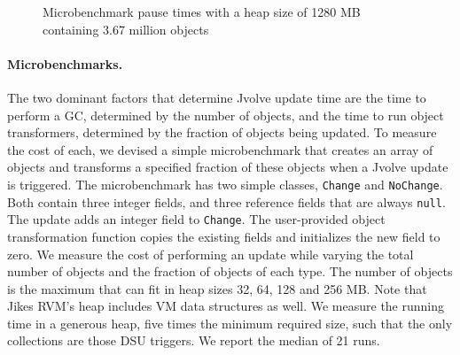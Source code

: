 \documentclass[9pt]{sigplanconf}
\newcommand{\DSU}{{\sc Jvolve}}
\newcommand{\JikesRVM}{Jikes RVM}
\begin{document}
% 
\begin{figure}[t]
\begin{center}
\caption{Microbenchmark pause times with a heap size of 1280 MB containing
3.67 million objects\label{fig:microbench}}
\end{center}
\end{figure}

\paragraph{Microbenchmarks.}
The two dominant factors that determine \DSU{} update time are the time to
perform a GC, determined by the number of objects, and the time to run
object transformers, determined by the fraction of objects being
updated.  To measure the cost of each, we devised a simple 
microbenchmark that creates an array of objects and transforms a specified
fraction of these objects when a \DSU{} update is triggered. The
microbenchmark has two simple classes, \texttt{Change} and
\texttt{NoChange}. Both contain three integer fields, and three reference
fields that are always {\tt null}. The update adds an integer field to
{\tt Change}. The user-provided object transformation function copies the
existing fields and initializes the new field to zero.
We measure the cost of performing an update while varying the total
number of objects and the fraction of objects of each type. The number of
objects is the maximum that can fit in heap sizes 32, 64, 128 and 256
MB.  Note that \JikesRVM{}'s heap includes VM data structures as well. We
measure the running time in a generous heap, five times the minimum required size, such that the only collections are those DSU triggers. We report the
median of 21 runs.
\end{document}

